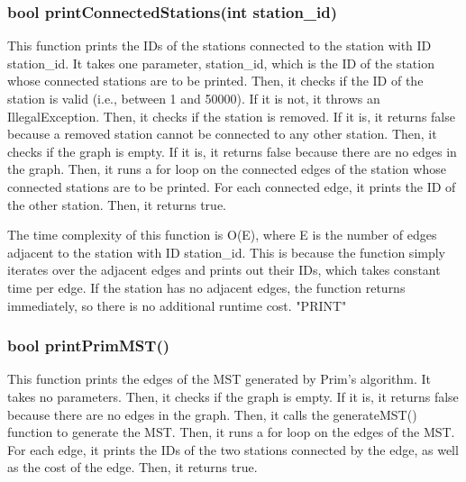 \documentclass[a4paper]{article}
\begin{document}
		\subsubsection{{\color{orange}bool} {\color{draculapurple}printConnectedStations}({\color{draculapurple}int} station\_id)}
			
			This function prints the IDs of the stations connected to the station with ID {\color{draculapurple}station\_id}. It takes one parameter, {\color{draculapurple}station\_id}, which is the ID of the station whose connected stations are to be printed.
			Then, it checks if the ID of the station is valid (i.e., between 1 and 50000). If it is not, it throws an {\color{draculapurple}IllegalException}.
			Then, it checks if the station is removed. If it is, it returns {\color{draculapurple}false} because a removed station cannot be connected to any other station.
			Then, it checks if the graph is empty. If it is, it returns {\color{draculapurple}false} because there are no edges in the graph.
			Then, it runs a for loop on the connected edges of the station whose connected stations are to be printed. For each connected edge, it prints the ID of the other station.
			Then, it returns {\color{draculapurple}true}.

			The time complexity of this function is {\color{lightblue}O(E)}, where {\color{draculapurple}E} is the number of edges adjacent to the station with ID {\color{draculapurple}station\_id}. This is because the function simply iterates over the adjacent edges and prints out their IDs, which takes constant time per edge. If the station has no adjacent edges, the function returns immediately, so there is no additional runtime cost.
			{\color{GoldenYellow}"PRINT"}

		
			
		\subsubsection{{\color{orange}bool} {\color{draculapurple}printPrimMST}()}
			
			This function prints the edges of the MST generated by Prim's algorithm. It takes no parameters.
			Then, it checks if the graph is empty. If it is, it returns {\color{draculapurple}false} because there are no edges in the graph.
			Then, it calls the {\color{draculapurple}generateMST()} function to generate the MST. Then, it runs a for loop on the edges of the MST. For each edge, it prints the IDs of the two stations connected by the edge, as well as the cost of the edge.
			Then, it returns {\color{draculapurple}true}.
\end{document}
